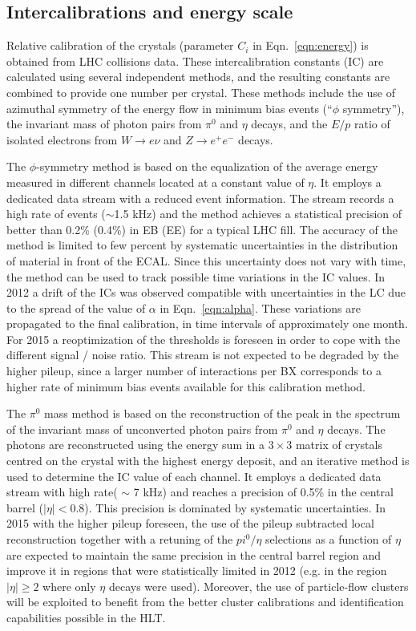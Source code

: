 \documentclass[journal]{IEEEtran}
\begin{document}
\subsection{Intercalibrations and energy scale}
\label{sec:intercalibrations}
Relative calibration of the crystals (parameter $C_i$ in Eqn.~\ref{eqn:energy}) is obtained from LHC collisions data. These intercalibration constants (IC) are calculated using several independent methods, and the resulting constants are combined to provide one number per crystal. These methods include the use of azimuthal symmetry of the energy flow in minimum bias events (``$\phi$ symmetry''), the invariant mass of photon pairs from $\pi^0$ and $\eta$ decays, and the $E/p$ ratio of isolated electrons from $W\to e\nu$ and $Z\to e^+e^-$ decays.

The $\phi$-symmetry method is based on the equalization of the average energy measured in different channels located at a constant value of $\eta$. It employs a dedicated data stream with a reduced event information. The stream records a high rate of events ($\sim$1.5 kHz) and the method achieves a statistical precision of better than 0.2\% (0.4\%) in EB (EE) for a typical LHC fill. The accuracy of the method is limited to few percent by systematic uncertainties in the distribution of material in front of the ECAL. Since this uncertainty does not vary with time, the method can be used to track possible time variations in the IC values. In 2012 a drift of the ICs was observed compatible with uncertainties in the LC due to the spread of the value of $\alpha$ in Eqn.~\ref{eqn:alpha}. These variations are propagated to the final calibration, in time intervals of approximately one month. For 2015 a reoptimization of the thresholds is foreseen in order to cope with the different signal / noise ratio. This stream is not expected to be degraded by the higher pileup, since a larger number of interactions per BX corresponds to a higher rate of minimum bias events available for this calibration method.

The $\pi^0$ mass method is based on the reconstruction of the peak in the spectrum of the invariant mass of unconverted photon pairs from $\pi^0$ and $\eta$ decays. The photons are reconstructed using the energy sum in a $3 \times 3$ matrix of crystals centred on the crystal with the highest energy deposit, and an iterative method is used to determine the IC value of each channel. It employs a dedicated data stream with high rate( $\sim$ 7 kHz) and reaches a precision of 0.5\% in the central barrel ($\vert\eta\vert<0.8$). This precision is dominated by systematic uncertainties. In 2015 with the higher pileup foreseen, the use of the pileup subtracted local reconstruction together with a retuning of the $pi^0 / \eta$ selections as a function of $\eta$ are expected to maintain the same precision in the central barrel region and improve it in regions that were statistically limited in 2012 (e.g. in the region $\vert\eta\vert\ge2$ where only $\eta$ decays were used). Moreover, the use of particle-flow clusters \cite{CMS:2010eua} will be exploited to benefit from the better cluster calibrations and identification capabilities possible in the HLT.
\end{document}
